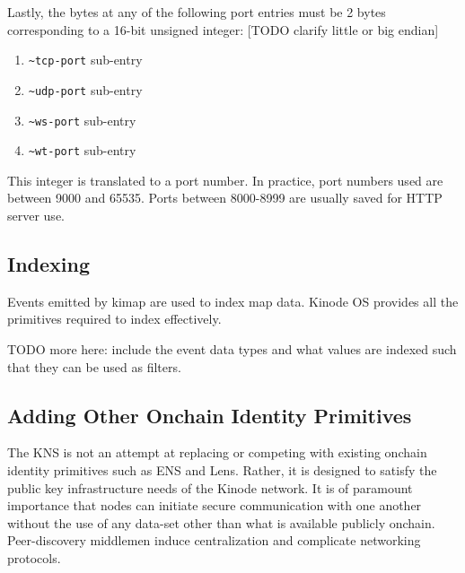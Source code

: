 \documentclass[runningheads]{llncs}
\begin{document}
Lastly, the bytes at any of the following port entries must be 2 bytes corresponding to a 16-bit unsigned integer: [TODO clarify little or big endian]

\begin{enumerate}
\item \verb|~tcp-port| sub-entry
\item \verb|~udp-port| sub-entry
\item \verb|~ws-port| sub-entry
\item \verb|~wt-port| sub-entry
\end{enumerate}
This integer is translated to a port number.
In practice, port numbers used are between 9000 and 65535.
Ports between 8000-8999 are usually saved for HTTP server use.

\subsection{Indexing}
\label{sec:knsindexing}

Events emitted by kimap are used to index map data.
Kinode OS provides all the primitives required to index effectively.

TODO more here: include the event data types and what values are indexed such that they can be used as filters.

\subsection{Adding Other Onchain Identity Primitives}
\label{sec:knsotherprimitives}

The KNS is not an attempt at replacing or competing with existing onchain identity primitives such as ENS and Lens.
Rather, it is designed to satisfy the public key infrastructure needs of the Kinode network.
It is of paramount importance that nodes can initiate secure communication with one another without the use of any data-set other than what is available publicly onchain.
Peer-discovery middlemen induce centralization and complicate networking protocols.
\end{document}
